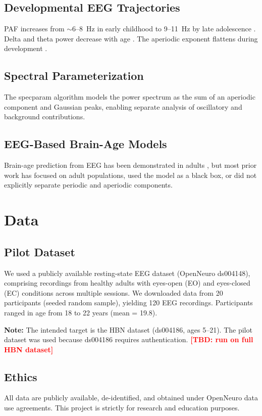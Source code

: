 \documentclass[12pt, a4paper]{article}
\newcommand{\tbd}[1]{\textcolor{red}{\textbf{[TBD: #1]}}}
\begin{document}
\subsection{Developmental EEG Trajectories}
PAF increases from $\sim$6--8~Hz in early childhood to 9--11~Hz by late adolescence \citep{miskovic2015development, cellier2021alpha}. Delta and theta power decrease with age \citep{clarke2001age, whitford2007maturation}. The aperiodic exponent flattens during development \citep{ostlund2022specparam}.

\subsection{Spectral Parameterization}
The specparam algorithm \citep{donoghue2020specparam} models the power spectrum as the sum of an aperiodic component and Gaussian peaks, enabling separate analysis of oscillatory and background contributions.

\subsection{EEG-Based Brain-Age Models}
Brain-age prediction from EEG has been demonstrated in adults \citep{engemann2022brainage, sun2019brainage}, but most prior work has focused on adult populations, used the model as a black box, or did not explicitly separate periodic and aperiodic components.

\section{Data}

\subsection{Pilot Dataset}
We used a publicly available resting-state EEG dataset (OpenNeuro ds004148), comprising recordings from healthy adults with eyes-open (EO) and eyes-closed (EC) conditions across multiple sessions. We downloaded data from 20 participants (seeded random sample), yielding 120 EEG recordings. Participants ranged in age from 18 to 22 years (mean = 19.8).

\textbf{Note:} The intended target is the HBN dataset (ds004186, ages 5--21). The pilot dataset was used because ds004186 requires authentication. \tbd{run on full HBN dataset}

\subsection{Ethics}
All data are publicly available, de-identified, and obtained under OpenNeuro data use agreements. This project is strictly for research and education purposes.
\end{document}
